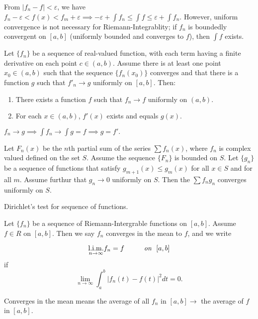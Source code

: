 \documentclass[10pt,a4paper]{book}
\begin{document}
\PP From $|f_n - f| < \varepsilon$, we have $ f_n - \varepsilon <f(x)< f_m + \varepsilon \implies -\varepsilon + \int f_n \leq \int f \leq \varepsilon + \int f_n.$ However, uniform convergence is not necessary for Riemann-Integrablity; if $f_n$ is boundedly convergent on $[a,b]$ (uniformly bounded and converges to $f$), then $\int f$ exists.
\begin{Thm}
Let $\{f_n\}$ be a sequence of real-valued function, with each term having a finite derivative on each point $c \in (a,b).$ Assume there is at least one point $x_0 \in (a,b)$ such that the sequence $\{f_n(x_0)\}$ converges and that there is a function $g$ such that $f'_n \rightarrow g$ uniformly on $[a,b].$ Then:
\begin{enumerate}
    \item There exists a function $f$ such that $f_n \rightarrow f$ uniformly on $(a,b)$.
    \item For each $x \in (a,b)$, $f'(x)$ exists and equals $g(x).$
\end{enumerate}
\end{Thm}
\PP $f_n \rightarrow g \implies \int f_n \rightarrow \int g = f \implies g = f'.$
\begin{Thm}
Let $F_n(x)$ be the $n$th partial sum of the series $\sum f_n(x)$, where $f_n$ is complex valued defined on the set $S$. Assume the sequence $\{F_n\}$ is bounded on $S$. Let $\{g_n\}$ be a sequence of functions that satisfy $g_{m+1}(x) \leq g_m(x)$ for all $x \in S$ and for all $m$. Assume furthur that $g_n \rightarrow 0$ uniformly on $S$. Then the $\sum f_ng_n$ converges uniformly on $S$.
\end{Thm}
\PP Dirichlet's test for sequence of functions.
\begin{deff}
Let $\{f_n\}$ be a sequence of Riemann-Intergrable functions on $[a,b]$. Assume $f \in R$ on $[a,b]$. Then we say $f_n$ converges in the mean to $f$, and we write

$$\underset{n\to\infty}{\mathrm{l.i.m.}}  f_n = f \sp \textit{on}\ \  [a,b] $$
if 
$$\lim_{n\rightarrow \infty}\int_a^b |f_n(t) - f(t)|^2 dt = 0.$$
\end{deff}
\PP Converges in the mean means the average of all $ f_n$ in $[a,b] \rightarrow$ the average of $f$ in $[a,b]$. 
\end{document}
